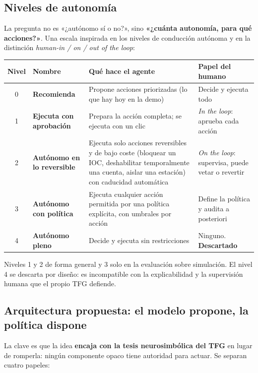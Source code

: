 \documentclass[11pt,a4paper]{article}
\begin{document}
\subsection{Niveles de autonomía}

La pregunta no es «¿autónomo sí o no?», sino \textbf{«¿cuánta autonomía, para qué acciones?»}. Una escala
inspirada en los niveles de conducción autónoma y en la distinción \textit{human-in / on / out of the loop}:

\begin{center}
\small
\renewcommand{\arraystretch}{1.25}
\begin{tabularx}{\linewidth}{c >{\bfseries}l X X}
\toprule
Nivel & Nombre & Qué hace el agente & Papel del humano \\
\midrule
0 & Recomienda & Propone acciones priorizadas (lo que hay hoy en la demo) & Decide y ejecuta todo \\
1 & Ejecuta con aprobación & Prepara la acción completa; se ejecuta con un clic & \textit{In the loop}: aprueba cada acción \\
2 & Autónomo en lo reversible & Ejecuta solo acciones reversibles y de bajo coste (bloquear un IOC, deshabilitar temporalmente una cuenta, aislar una estación) con caducidad automática & \textit{On the loop}: supervisa, puede vetar o revertir \\
3 & Autónomo con política & Ejecuta cualquier acción permitida por una política explícita, con umbrales por acción & Define la política y audita a posteriori \\
4 & Autónomo pleno & Decide y ejecuta sin restricciones & Ninguno. \textbf{Descartado} \\
\bottomrule
\end{tabularx}
\end{center}

\begin{clave}
Niveles 1 y 2 de forma general y 3 solo en la evaluación sobre simulación. El nivel 4 se descarta por diseño: es
incompatible con la explicabilidad y la supervisión humana que el propio TFG defiende.
\end{clave}

\subsection{Arquitectura propuesta: el modelo propone, la política dispone}

La clave es que la idea \textbf{encaja con la tesis neurosimbólica del TFG} en lugar de romperla: ningún componente
opaco tiene autoridad para actuar. Se separan cuatro papeles:
\end{document}
